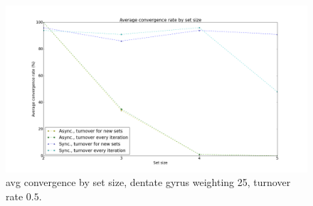 




\begin{figure}[h!]
    \centering
    \includegraphics[width=14cm]{fig/avg_convergence_rate.png}
    \caption{avg convergence by set size, dentate gyrus weighting 25, turnover rate $0.5$.}
    \label{fig:avg_convergence_rate}
\end{figure}

